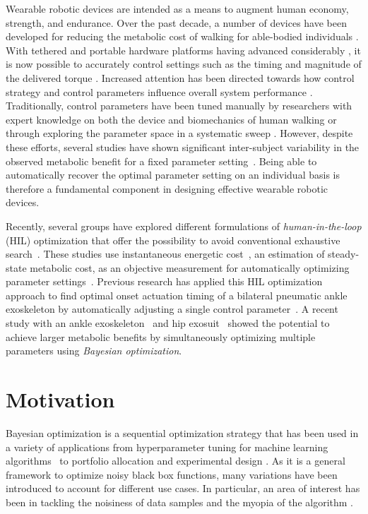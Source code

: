 Wearable robotic devices are intended as a means to augment human economy, strength, and endurance. Over the past decade, a number of devices have been developed for reducing the metabolic cost of walking for able-bodied individuals \citep{Malcolm2013, Mooney2016, Caputo2014,  Panizzolo2016}. With tethered and portable hardware platforms having advanced considerably \citep{Malcolm2013, Lee2018, Panizzolo2015}, it is now possible to accurately control settings such as the timing and magnitude of the delivered torque \citep{Malcolm2013, Collins2015, Ding2017, Kim2015, Kim2017inv, Lee2016}. Increased attention has been directed towards how control strategy and control parameters influence overall system performance \citep{Caputo2014, Kim2015, Kim2017inv, Quinlivan2017}. Traditionally, control parameters have been tuned manually by researchers with expert knowledge on both the device and biomechanics of human walking or through exploring the parameter space in a systematic sweep \citep{Caputo2015, Quinlivan2017}. However, despite these efforts, several studies have shown significant inter-subject variability in the observed metabolic benefit for a fixed parameter setting~\citep{Quesada2016}. Being able to automatically recover the optimal parameter setting on an individual basis is therefore a fundamental component in designing effective wearable robotic devices.

Recently, several groups have explored different formulations of \emph{human-in-the-loop} (HIL) optimization that offer the possibility to avoid conventional exhaustive search~\citep{Koller2016, Zhang2017, Ding2018, Kim2017}. These studies use instantaneous energetic cost~\citep{Selinger2014}, an estimation of steady-state metabolic cost, as an objective measurement for automatically optimizing parameter settings~\citep{Koller2016, Felt2015, Zhang2017, Ding2018}. Previous research has applied this HIL optimization approach to find optimal onset actuation timing of a bilateral pneumatic ankle exoskeleton by automatically adjusting a single control parameter~\citep{Koller2016}. A recent study with an ankle exoskeleton~\citep{Zhang2017} and hip exosuit~\citep{Ding2018} showed the potential to achieve larger metabolic benefits by simultaneously optimizing multiple parameters using \emph{Bayesian optimization}.

\section*{Motivation}
Bayesian optimization is a sequential optimization strategy that has been used in a variety of applications from hyperparameter tuning for machine learning algorithms~\citep{NIPS2012_4522,pmlr-v22-mahendran12} to portfolio allocation \citep{1009.5419} and experimental design \citep{Brochu2009}. As it is a general framework to optimize noisy black box functions, many variations have been introduced to account for different use cases. In particular, an area of interest has been in tackling the noisiness of data samples \citep{rue2009,1603.02038,1410.7172} and the myopia of the algorithm \citep{NIPS2016_6188,1510.06299}. 

